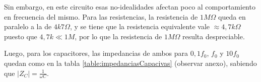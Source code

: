 \documentclass{article}
\begin{document}

            Sin embargo, en este circuito esas no-idealidades afectan poco al comportamiento en frecuencia del mismo. Para las resistencias, la resistencia de $1 M\Omega$ queda en paralelo a la de $4k7\Omega$, y se tiene que la resistencia equivalente vale $\approx 4,7k\Omega$ puesto que $4,7k \ll 1M$, por lo que la resistencia de $ 1 M\Omega$ resulta despreciable.



            Luego, para los capacitores, las impedancias de ambos para $0,1f_0$, $f_0$ y $10f_0$ quedan como en la tabla \ref{table:impedanciasCapacivas} (observar anexo), sabiendo que $|Z_C|=\frac{1}{\omega C}$.
\end{document}
